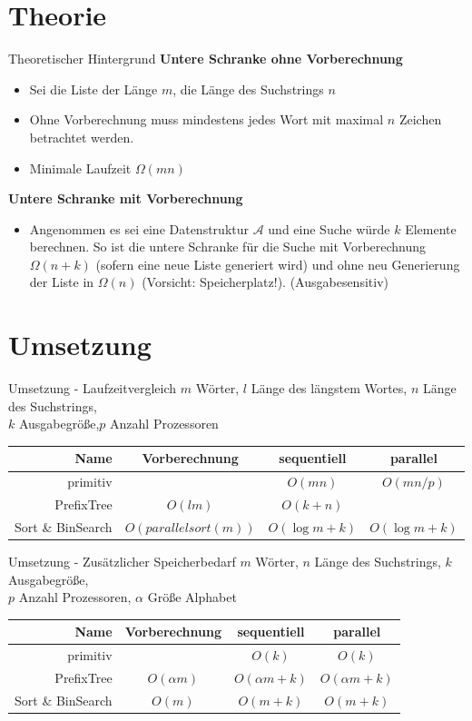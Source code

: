 \documentclass[11pt, xcolor=dvipsnames]{beamer}
\begin{document}
	\section{Theorie}
	\begin{frame}{Theoretischer Hintergrund}
	\textbf{Untere Schranke ohne Vorberechnung}
		\begin{itemize}
			\item Sei die Liste der Länge $m$, die Länge des Suchstrings $n$
			\item Ohne Vorberechnung muss mindestens jedes Wort mit maximal $n$ Zeichen betrachtet werden.
			\item Minimale Laufzeit $\Omega(mn)$
		\end{itemize}
		\textbf{Untere Schranke mit Vorberechnung}
		\begin{itemize}
			\item Angenommen es sei eine Datenstruktur $\mathcal{A}$ und eine Suche würde $k$ Elemente berechnen. So ist die untere Schranke für die Suche mit Vorberechnung $\Omega(n+k)$ (sofern eine neue Liste generiert wird) und ohne neu Generierung der Liste in $\Omega(n)$ (Vorsicht: Speicherplatz!). (Ausgabesensitiv)	
		\end{itemize}
	\end{frame}
	\section{Umsetzung}
	\begin{frame}{Umsetzung - Laufzeitvergleich}
		$m$ Wörter, $l$ Länge des längstem Wortes, $n$ Länge des Suchstrings,\\$k$ Ausgabegröße,$p$ Anzahl Prozessoren 
		
		\begin{center}
			\begin{tabular}{r|ccc}
		\textbf{Name}	&  Vorberechnung & sequentiell & parallel \\ 
		\hline
		primitiv	& &$O(mn)$ & $O(mn/p)$ \\ 
		PrefixTree	& $O(lm)$ & $O(k+n)$ & \\
		Sort \& BinSearch & $O(parallelsort(m))$ & $O(\log m + k)$ & $O(\log m + k)$
		\end{tabular}
		\end{center} 
	\end{frame}
	
	\begin{frame}{Umsetzung - Zusätzlicher Speicherbedarf}
		$m$ Wörter, $n$ Länge des Suchstrings, $k$ Ausgabegröße, \\$p$ Anzahl Prozessoren, $\alpha$ Größe Alphabet
		\begin{center}
		\begin{tabular}{r|ccc}
			\textbf{Name}	&  Vorberechnung & sequentiell & parallel \\ 
			\hline
			primitiv	& &$ O(k)$ & $O(k)$ \\ 
			PrefixTree	& $O(\alpha m)$ & $O(\alpha m + k)$ & $O(\alpha m + k)$ \\
			Sort \& BinSearch & $O(m)$ & $O(m+k)$ & $O(m+k)$
		\end{tabular} 
		\end{center}
	\end{frame}
	
\end{document}
